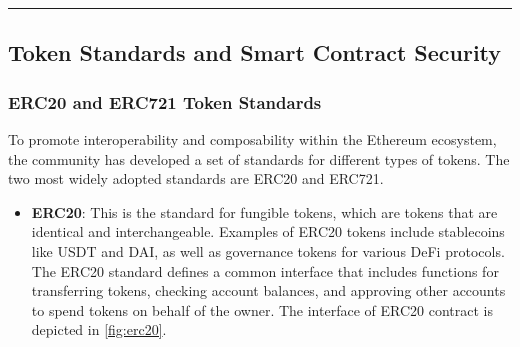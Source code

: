 \begin{center}\rule{0.5\linewidth}{0.5pt}\end{center}

\subsection{Token Standards and Smart Contract
	Security}\label{section-3-token-standards-and-smart-contract-security}

\subsubsection{ERC20 and ERC721 Token
	Standards}\label{erc20-and-erc721-token-standards}

To promote interoperability and composability within the Ethereum
ecosystem, the community has developed a set of standards for different
types of tokens. The two most widely adopted standards are ERC20 and
ERC721.

\begin{itemize}
	\tightlist
	\item
	\textbf{ERC20}: This is the standard for fungible tokens, which are
	tokens that are identical and interchangeable. Examples of ERC20
	tokens include stablecoins like USDT and DAI, as well as governance
	tokens for various DeFi protocols. The ERC20 standard defines a common
	interface that includes functions for transferring tokens, checking
	account balances, and approving other accounts to spend tokens on
	behalf of the owner.
	The interface of ERC20 contract is depicted in \autoref{fig:erc20}.
\end{itemize}

